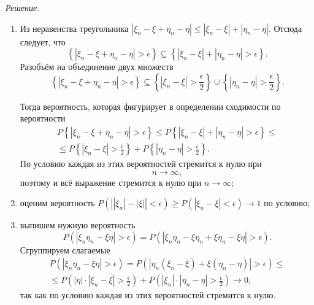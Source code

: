 \textit{Решение.}
\begin{enumerate}[label=\alph*)]
\item Из неравенства треугольника
$ \left| \xi_n - \xi + \eta_n - \eta \right| \leq \left| \xi_n - \xi \right| + \left| \eta_n - \eta \right| $.
Отсюда следует, что
$$ \left\{ \left| \xi_n - \xi + \eta_n - \eta \right| > \epsilon \right\} \subseteq
\left\{ \left| \xi_n - \xi \right| + \left| \eta_n - \eta \right| > \epsilon \right\}.$$
Разобъём на объединение двух множеств
$$ \left\{ \left| \xi_n - \xi + \eta_n - \eta \right| > \epsilon \right\} \subseteq
\left\{ \left| \xi_n - \xi \right| > \frac{ \epsilon }{2} \right\} \cup \left\{ \left| \eta_n - \eta \right| > \frac{ \epsilon }{2} \right\}.$$

Тогда вероятность, которая фигурирует в определении сходимости по вероятности
\begin{equation*}
\begin{split}
P \left\{ \left| \xi_n - \xi + \eta_n - \eta \right| > \epsilon \right\} \leq
P \left\{ \left| \xi_n - \xi \right| + \left| \eta_n - \eta \right| > \epsilon \right\} \leq \\
\leq P \left\{ \left| \xi_n - \xi \right| > \frac{ \epsilon }{2} \right\} + P \left\{ \left| \eta_n - \eta \right| > \frac{ \epsilon }{2} \right\}.
\end{split}
\end{equation*}
По условию каждая из этих вероятностей стремится к нулю при
$$n \rightarrow \infty,$$
поэтому и всё выражение стремится к нулю при $n \rightarrow \infty $;
\item оценим вероятность
$P \left( \left| \left| \xi_n \right| - \left| \xi \right| \right| < \epsilon \right) \geq
P \left( \left| \xi_n - \xi \right| < \epsilon \right) \rightarrow
1$
по условию;
\item выпишем нужную вероятность
$$P \left( \left| \xi_n \eta_n - \xi \eta \right| > \epsilon \right) =
P \left( \left| \xi_n \eta_n - \xi \eta_n + \xi \eta_n - \xi \eta \right| > \epsilon \right).$$
Сгруппируем слагаемые
\begin{equation*}
\begin{split}
P \left( \left| \xi_n \eta_n - \xi \eta \right| > \epsilon \right) =
P \left( \left| \eta_n \left( \xi_n - \xi \right) + \xi \left( \eta_n - \eta \right) \right| > \epsilon \right) \leq \\
\leq P \left( \left| \eta \right| \cdot \left| \xi_n - \xi \right| > \frac{ \epsilon }{2} \right) +
P \left( \left| \xi_n \right| \cdot \left| \eta_n - \eta \right| > \frac{ \epsilon }{2} \right) \rightarrow
0,
\end{split}
\end{equation*}
так как по условию каждая из этих вероятностей стремится к нулю.
\end{enumerate}
